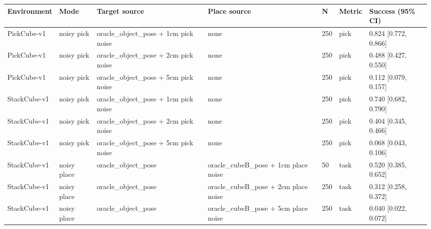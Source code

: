 \begin{tabular}{lllllll}
\toprule
Environment & Mode & Target source & Place source & N & Metric & Success (95\% CI) \\
\midrule
PickCube-v1 & noisy pick & oracle\_object\_pose + 1cm pick noise & none & 250 & pick & 0.824 [0.772, 0.866] \\
PickCube-v1 & noisy pick & oracle\_object\_pose + 2cm pick noise & none & 250 & pick & 0.488 [0.427, 0.550] \\
PickCube-v1 & noisy pick & oracle\_object\_pose + 5cm pick noise & none & 250 & pick & 0.112 [0.079, 0.157] \\
StackCube-v1 & noisy pick & oracle\_object\_pose + 1cm pick noise & none & 250 & pick & 0.740 [0.682, 0.790] \\
StackCube-v1 & noisy pick & oracle\_object\_pose + 2cm pick noise & none & 250 & pick & 0.404 [0.345, 0.466] \\
StackCube-v1 & noisy pick & oracle\_object\_pose + 5cm pick noise & none & 250 & pick & 0.068 [0.043, 0.106] \\
StackCube-v1 & noisy place & oracle\_object\_pose & oracle\_cubeB\_pose + 1cm place noise & 50 & task & 0.520 [0.385, 0.652] \\
StackCube-v1 & noisy place & oracle\_object\_pose & oracle\_cubeB\_pose + 2cm place noise & 250 & task & 0.312 [0.258, 0.372] \\
StackCube-v1 & noisy place & oracle\_object\_pose & oracle\_cubeB\_pose + 5cm place noise & 250 & task & 0.040 [0.022, 0.072] \\
\bottomrule
\end{tabular}
